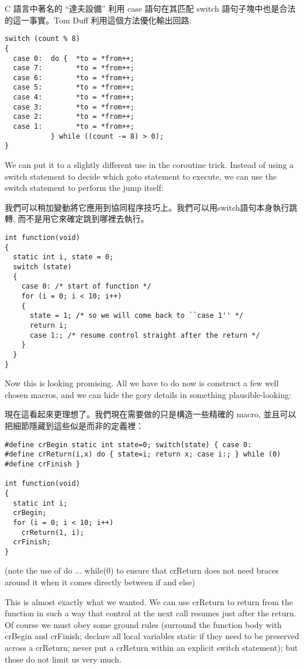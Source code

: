 \documentclass[12pt]{article}
\begin{document}
\begin{CJK}{UTF8}{bsmi}
C 語言中著名的 ``達夫設備'' 利用 case 語句在其匹配 switch 語句子塊中也是合法的這一事實。Tom Duff
利用這個方法優化輸出回路:

\begin{lstlisting}[basicstyle=\footnotesize, breaklines=true]
switch (count % 8) 
{
  case 0:  do {  *to = *from++;
  case 7:        *to = *from++;
  case 6:        *to = *from++;
  case 5:        *to = *from++;
  case 4:        *to = *from++;
  case 3:        *to = *from++;
  case 2:        *to = *from++;
  case 1:        *to = *from++;
           } while ((count -= 8) > 0);
}
\end{lstlisting}

We can put it to a slightly different use in the coroutine trick. Instead of using a switch statement to decide which goto statement to execute, we can use the switch statement to perform the jump itself:

我們可以稍加變動將它應用到協同程序技巧上。我們可以用switch語句本身執行跳轉, 而不是用它來確定跳到哪裡去執行。 

\begin{lstlisting}[basicstyle=\footnotesize, breaklines=true]
int function(void) 
{
  static int i, state = 0;
  switch (state) 
  {
    case 0: /* start of function */
    for (i = 0; i < 10; i++) 
    {
      state = 1; /* so we will come back to ``case 1'' */
      return i;
      case 1:; /* resume control straight after the return */
    }
  }
}
\end{lstlisting}

Now this is looking promising. All we have to do now is construct a few well chosen macros, and we can hide the gory details in something plausible-looking:

現在這看起來更理想了。我們現在需要做的只是構造一些精確的 macro, 並且可以把細節隱藏到這些似是而非的定義裡： 

\begin{lstlisting}[basicstyle=\footnotesize, breaklines=true]
#define crBegin static int state=0; switch(state) { case 0:
#define crReturn(i,x) do { state=i; return x; case i:; } while (0)
#define crFinish }

int function(void) 
{
  static int i;
  crBegin;
  for (i = 0; i < 10; i++)
    crReturn(1, i);
  crFinish;
}
\end{lstlisting}

(note the use of do ... while(0) to ensure that crReturn does not need braces around it when it comes directly between if and else)

This is almost exactly what we wanted. We can use crReturn to return from the function in such a way that control at the next call resumes just after the return. Of course we must obey some ground rules (surround the function body with crBegin and crFinish; declare all local variables static if they need to be preserved across a crReturn; never put a crReturn within an explicit switch statement); but those do not limit us very much.


\end{CJK}
\end{document}
